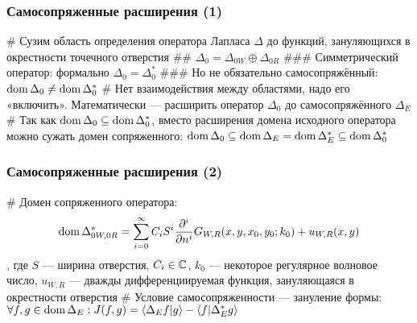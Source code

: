 \documentclass{beamer}
\begin{document}
\begin{frame}[fragile]
\frametitle{Самосопряженные расширения (1)}
\begin{easylist}[itemize]
# Сузим область определения оператора Лапласа $\Delta$ до функций, зануляющихся в окрестности точечного отверстия
## $\Delta_0 = \Delta_{0W} \oplus \Delta_{0R}$
### Симметрический оператор: формально $\Delta_0 = \Delta_0^*$
### Но не обязательно самосопряжённый: $\operatorname{dom}{\Delta_0} \ne \operatorname{dom}{\Delta_0^*}$
# Нет взаимодействия между областями, надо его «включить». Математически — расширить оператор $\Delta_0$ до самосопряжённого $\Delta_E$
# Так как $\operatorname{dom}{\Delta_0} \subseteq \operatorname{dom}{\Delta_0^*}$, вместо расширения домена исходного оператора можно сужать домен сопряженного: $\operatorname{dom}{\Delta_0} \subseteq \operatorname{dom}{\Delta_E} = \operatorname{dom}{\Delta_E^*} \subseteq \operatorname{dom}{\Delta_0^*}$
\end{easylist}
\end{frame}

\begin{frame}[fragile]
\frametitle{Самосопряженные расширения (2)}
\begin{easylist}[itemize]
# Домен сопряженного оператора:
\[
\operatorname{dom} \Delta_{0W, 0R}^* = \sum\limits_{i = 0}^\infty C_i S^i \pdv[i]{}{n} G_{W, R}(x, y, x_0, y_0; k_0) + u_{W, R} (x, y)
\],
где $S$ — ширина отверстия, $C_i \in \mathbb{C}$, $k_0$ — некоторое регулярное волновое число, $u_{W, R}$ — дважды дифференциируемая функция, зануляющаяся в окрестности отверстия
# Условие самосопряженности — зануление формы: $\forall f, g \in \dom{\Delta_E}: J(f, g) = \ip{\Delta_E f}{g} - \ip{f}{\Delta_E^* g}$
\end{easylist}
\end{frame}

\end{document}
